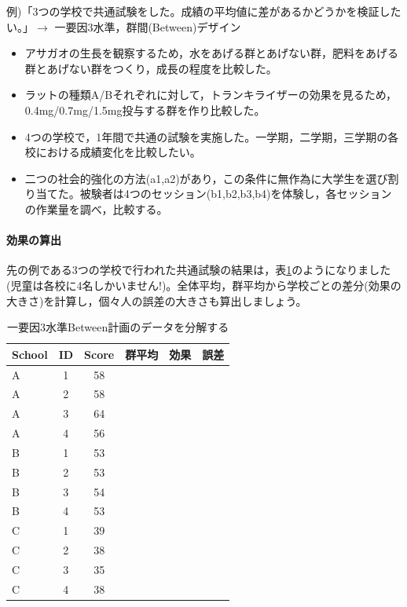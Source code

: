 \documentclass{ltjbook}
\begin{document}
例)「3つの学校で共通試験をした。成績の平均値に差があるかどうかを検証したい。」$\to$ 一要因3水準，群間(Between)デザイン

\begin{itemize}
	\item アサガオの生長を観察するため，水をあげる群とあげない群，肥料をあげる群とあげない群をつくり，成長の程度を比較した。
	\item ラットの種類A/Bそれぞれに対して，トランキライザーの効果を見るため，0.4mg/0.7mg/1.5mg投与する群を作り比較した。
	\item 4つの学校で，1年間で共通の試験を実施した。一学期，二学期，三学期の各校における成績変化を比較したい。
	\item 二つの社会的強化の方法(a1,a2)があり，この条件に無作為に大学生を選び割り当てた。被験者は4つのセッション(b1,b2,b3,b4)を体験し，各セッションの作業量を調べ，比較する。
\end{itemize}
\paragraph{効果の算出}先の例である3つの学校で行われた共通試験の結果は，表\ref{tbl:m12_example}のようになりました(児童は各校に4名しかいません!)。全体平均，群平均から学校ごとの差分(効果の大きさ)を計算し，個々人の誤差の大きさも算出しましょう。
\begin{table}[ht]
	\centering
	\caption{一要因3水準Between計画のデータを分解する}
	\begin{tabular}{lccccc}
		\hline
		School & ID & Score & 群平均 & 効果 & 誤差 \\
		\hline
		A      & 1  & 58    &     &    &    \\
		A      & 2  & 58    &     &    &    \\
		A      & 3  & 64    &     &    &    \\
		A      & 4  & 56    &     &    &    \\
		B      & 1  & 53    &     &    &    \\
		B      & 2  & 53    &     &    &    \\
		B      & 3  & 54    &     &    &    \\
		B      & 4  & 53    &     &    &    \\
		C      & 1  & 39    &     &    &    \\
		C      & 2  & 38    &     &    &    \\
		C      & 3  & 35    &     &    &    \\
		C      & 4  & 38    &     &    &    \\
		\hline
	\end{tabular}
	\label{tbl:m12_example}
\end{table}
\end{document}
